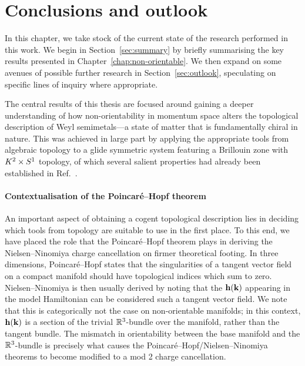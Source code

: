 \chapter{Conclusions and outlook}\label{chap:conclusions}

In this chapter, we take stock of the current state of the research performed in this work. We begin in Section~\ref{sec:summary} by briefly summarising the key results presented in Chapter~\ref{chap:non-orientable}. We then expand on some avenues of possible further research in Section~\ref{sec:outlook}, speculating on specific lines of inquiry where appropriate. %

\label{sec:summary}

The central results of this thesis are focused around gaining a deeper understanding of how non-orientability in momentum space alters the topological description of Weyl semimetals---a state of matter that is fundamentally chiral in nature. This was achieved in large part by applying the appropriate tools from algebraic topology to a glide symmetric system featuring a Brillouin zone with $K^2\times S^1$ topology, of which several salient properties had already been established in Ref.~\cite{Fonseca-Vaidya_nonorientable}.

\subsubsection{Contextualisation of the Poincaré--Hopf theorem}

An important aspect of obtaining a cogent topological description lies in deciding which tools from topology are suitable to use in the first place. To this end, we have placed the role that the Poincaré--Hopf theorem plays in deriving the Nielsen--Ninomiya charge cancellation on firmer theoretical footing. In three dimensions, Poincaré--Hopf states that the singularities of a tangent vector field on a compact manifold should have topological indices which sum to zero. Nielsen--Ninomiya is then usually derived by noting that the $\vb{h}(\vb{k})$ appearing in the model Hamiltonian can be considered such a tangent vector field. We note that this is categorically not the case on non-orientable manifolds; in this context, $\vb{h}(\vb{k})$ is a section of the trivial $\mathbb{R}^3$-bundle over the manifold, rather than the tangent bundle. The mismatch in orientability between the base manifold and the $\mathbb{R}^3$-bundle is precisely what causes the Poincaré--Hopf/Nielsen--Ninomiya theorems to become modified to a mod 2 charge cancellation.

